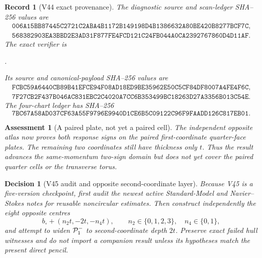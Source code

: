 \documentclass[11pt,oneside]{article}
\newtheorem{assessment}[theorem]{Assessment}
\newtheorem{record}[theorem]{Record}
\newtheorem{decision}[theorem]{Decision}
\theoremstyle{definition}
\theoremstyle{remark}
\begin{document}
\begin{record}[V44 exact provenance]
\label{rec:newv44-provenance}
The diagnostic source and scan-ledger SHA--256 values are
\[
\begin{gathered}
\texttt{006A15BB87445C2721C2ABA4B1172B149198D4B1386632A80BE420B8277BCF7C},\\
\texttt{568382903EA3BBD2E3AD31F877FE4FCD121C24FB044A0CA2392767860D4D11AF}.
\end{gathered}                                         \tag{44.10}
\]
The exact verifier is
\begin{center}
\footnotesize
{}.
\end{center}
Its source and canonical-payload SHA--256 values are
\[
\begin{gathered}
\texttt{FCBC59A6440CB89B41EFCE94F08AD18ED9BE35962E50C5CF84DF8007A4FE4F6C},\\
\texttt{7F27CB2F437B046AC831EBC2C4020A7CC6B353499BC18263D27A3356B013C54E}.
\end{gathered}                                         \tag{44.11}
\]
The four-chart ledger has SHA--256
\[
\texttt{7BC67A58AD037CF63A55F9796E9940D1CE6B5C09122C96F9FAADD126C817EB01}.
                                                               \tag{44.12}
\]
\end{record}

\begin{assessment}[A paired plate, not yet a paired cell]
\label{ass:newv44}
The independent opposite atlas now proves both response signs on
the paired first-coordinate quarter-face plates.  The remaining two
coordinates still have thickness only \(t\).  Thus the result
advances the same-momentum two-sign domain but does not yet cover
the paired quarter cells or the transverse torus.
\end{assessment}

\begin{decision}[V45 audit and opposite second-coordinate layer]
\label{dec:newv44-next}
Because V45 is a five-version checkpoint, first audit the newest
active Standard-Model and Navier--Stokes notes for reusable
noncircular estimates.  Then construct independently the eight
opposite centres
\[
 b_\circ+(n_2t,-2t,-n_4t),
 \qquad n_2\in\{0,1,2,3\},\quad n_4\in\{0,1\},          \tag{44.13}
\]
and attempt to widen \({\cal P}_1^-\) to second-coordinate depth
\(2t\).  Preserve exact failed hull witnesses and do not import a
companion result unless its hypotheses match the present direct
pencil.
\end{decision}
\end{document}
